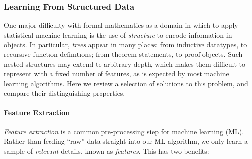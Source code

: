 


\subsubsection{Learning From Structured Data}

One major difficulty with formal mathematics as a domain in which to apply
statistical machine learning is the use of \emph{structure} to encode
information in objects. In particular, \emph{trees} appear in many places: from
inductive datatypes, to recursive function definitions; from theorem statements,
to proof objects. Such nested structures may extend to arbitrary depth, which
makes them difficult to represent with a fixed number of features, as is
expected by most machine learning algorithms. Here we review a selection of
solutions to this problem, and compare their distinguishing properties.

\paragraph{Feature Extraction}\label{sec:featureextraction}

\emph{Feature extraction} is a common pre-processing step for machine learning
(ML). Rather than feeding ``raw'' data straight into our ML algorithm, we only
learn a sample of \emph{relevant} details, known as \emph{features}. This has
two benefits:

